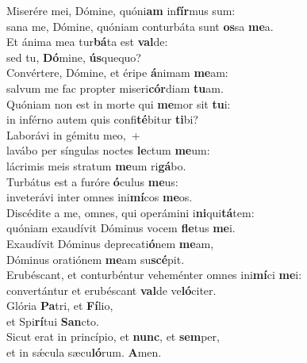 \evenverse Miserére mei, Dómine, quóni\textbf{am} in\textbf{fír}mus sum:~\*\\
\evenverse sana me, Dómine, quóniam conturbáta sunt \textbf{os}sa \textbf{me}a.\\
\oddverse Et ánima mea tur\textbf{bá}ta est \textbf{val}de:~\*\\
\oddverse sed tu, \textbf{Dó}mine, \textbf{ús}quequo?\\
\evenverse Convértere, Dómine, et éripe \textbf{á}nimam \textbf{me}am:~\*\\
\evenverse salvum me fac propter miseri\textbf{cór}diam \textbf{tu}am.\\
\oddverse Quóniam non est in morte qui \textbf{me}mor sit \textbf{tu}i:~\*\\
\oddverse in inférno autem quis confi\textbf{té}bitur \textbf{ti}bi?\\
\evenverse Laborávi in gémitu meo,~+\\
\evenverse  lavábo per síngulas noctes \textbf{le}ctum \textbf{me}um:~\*\\
\evenverse lácrimis meis stratum \textbf{me}um ri\textbf{gá}bo.\\
\oddverse Turbátus est a furóre \textbf{ó}culus \textbf{me}us:~\*\\
\oddverse inveterávi inter omnes ini\textbf{mí}cos \textbf{me}os.\\
\evenverse Discédite a me, omnes, qui operámini i\textbf{ni}qui\textbf{tá}tem:~\*\\
\evenverse quóniam exaudívit Dóminus vocem \textbf{fle}tus \textbf{me}i.\\
\oddverse Exaudívit Dóminus deprecati\textbf{ó}nem \textbf{me}am,~\*\\
\oddverse Dóminus oratiónem \textbf{me}am su\textbf{scé}pit.\\
\evenverse Erubéscant, et conturbéntur veheménter omnes ini\textbf{mí}ci \textbf{me}i:~\*\\
\evenverse convertántur et erubéscant \textbf{val}de ve\textbf{ló}citer.\\
\oddverse Glória \textbf{Pa}tri, et \textbf{Fí}lio,~\*\\
\oddverse et Spi\textbf{rí}tui \textbf{San}cto.\\
\evenverse Sicut erat in princípio, et \textbf{nunc}, et \textbf{sem}per,~\*\\
\evenverse et in sǽcula sæcu\textbf{ló}rum. \textbf{A}men.\\
